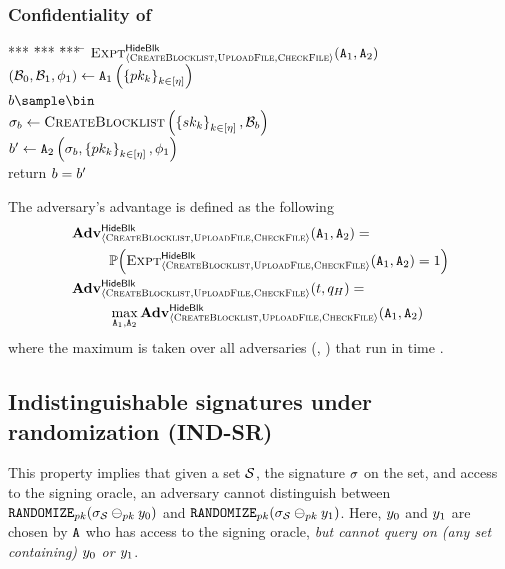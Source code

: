 	


\subsubsection{Confidentiality of \blklistToken}
%

					\begin{minipage}{0.5\columnwidth}
		\begin{tabbing}
			*** \= *** \= *** \= \kill
			$\Experiment{\hidingBlocklistLabel}{\contentModSchemeDefn}(\adversary[1], \adversary[2])$ \\
			\> $(\blocklist_0, \blocklist_1, \adversaryState{1}) \assign 
				\adversary[1]\left(\setOfAuditorPubkeys\right)$\\
			\> $\indBit \sample \bin$ \\
	        \> $\genericSig_\indBit \assign  \createBlocklist\left(\setOfAuditorPrivkeys, \blocklist_\indBit\right)$ \\
			\> $\advBit \assign \adversary[2]\left(\genericSig_\indBit,  \setOfAuditorPubkeys, \adversaryState{1}\right)$ \\
			\> return $b = b'$
		\end{tabbing}
	\end{minipage}


The adversary's advantage is defined as the following 
\begin{align*}
	& \Advantage{\hidingBlocklistLabel}{\contentModSchemeDefn}(\adversary[1], \adversary[2])= \\ 
	& ~~\qquad \prob{\Experiment{\hidingBlocklistLabel}{\contentModSchemeDefn}(\adversary[1], \adversary[2]) = 
		1} \\
	& \Advantage{\hidingBlocklistLabel}{\contentModSchemeDefn}(\timeBound, \oracleQueries) = \\
	& ~~\qquad \max_{\adversary[1], \adversary[2]} \Advantage{\hidingBlocklistLabel}{\contentModSchemeDefn}(\adversary[1], \adversary[2])
\end{align*}
where the maximum is taken over all adversaries (\adversary[1], \adversary[2]) that run in time \timeBound. 	   


\subsection{Indistinguishable signatures under randomization (IND-SR)}
\label{sec:defn:indsr}
%
This property implies that
given a set $\genericSetVar$, the signature $\genericSig$ on the set, 
and access to the signing oracle, an
adversary \adversary cannot distinguish between $\randomize[\pubKey](\genericSig[\genericSetVar] 
\sigMinus[\pubKey] 
\genericCInputElmt{0})$ and  $\randomize[\pubKey](\genericSig[\genericSetVar] \sigMinus[\pubKey] 
\genericCInputElmt{1})$. Here, $\genericCInputElmt{0}$ and $\genericCInputElmt{1}$ are
chosen by $\adversary$ who has access to the signing oracle,
\textit{but cannot query on (any set
	containing) $\genericCInputElmt{0}$
	or $\genericCInputElmt{1}$}. 

